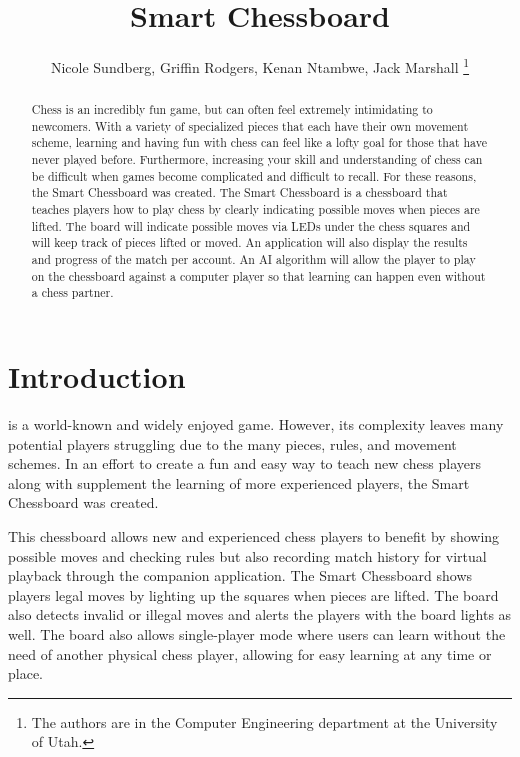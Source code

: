 \documentclass[11pt,journal]{IEEEtran}
\begin{document}
\title{Smart Chessboard}

\author{Nicole Sundberg, Griffin Rodgers, Kenan Ntambwe, Jack Marshall
  \thanks{The authors are in the Computer Engineering
    department at the University of Utah.}
}
\maketitle


\begin{abstract}
Chess is an incredibly fun game, but can often feel extremely intimidating to newcomers. With a variety of specialized pieces that each have their own movement scheme, learning and having fun with chess can feel like a lofty goal for those that have never played before. Furthermore, increasing your skill and understanding of chess can be difficult when games become complicated and difficult to recall. For these reasons, the Smart Chessboard was created.  The Smart Chessboard is a chessboard that teaches players how to play chess by clearly indicating possible moves when pieces are lifted. The board will indicate possible moves via LEDs under the chess squares and will keep track of pieces lifted or moved. An application will also display the results and progress of the match per account. An AI algorithm will allow the player to play on the chessboard against a computer player so that learning can happen even without a chess partner. 
\end{abstract}

\section{Introduction}

 is a world-known and widely enjoyed game. However, its complexity leaves many potential players struggling due to the many pieces, rules, and movement schemes. In an effort to create a fun and easy way to teach new chess players along with supplement the learning of more experienced players, the Smart Chessboard was created. 

This chessboard allows new and experienced chess players to benefit by showing possible moves and checking rules but also recording match history for virtual playback through the companion application. The Smart Chessboard shows players legal moves by lighting up the squares when pieces are lifted. The board also detects invalid or illegal moves and alerts the players with the board lights as well. The board also allows single-player mode where users can learn without the need of another physical chess player, allowing for easy learning at any time or place.
\end{document}
